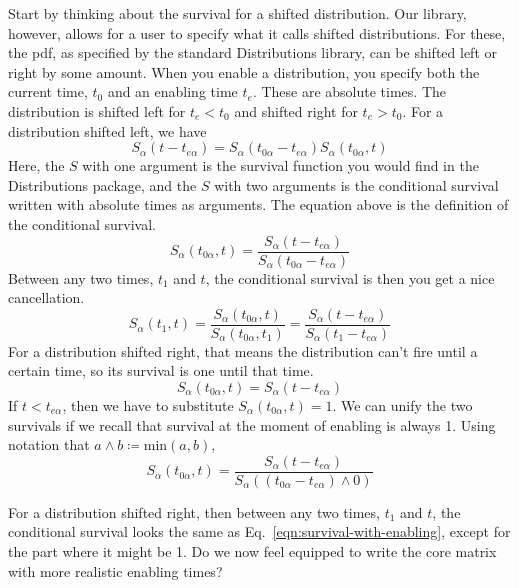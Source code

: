 \documentclass{article}
\begin{document}
Start by thinking about the survival for a shifted distribution. Our library, however, allows for a user to specify what it calls shifted distributions. For these, the pdf, as specified by the standard Distributions library, can be shifted left or right by some amount. When you enable a distribution, you specify both the current time, $t_0$ and an enabling time $t_e$. These are absolute times. The distribution is shifted left for $t_e<t_0$ and shifted right for $t_e>t_0$. For a distribution shifted left, we have
\begin{equation}
	S_{\alpha}(t-t_{e\alpha}) = S_{\alpha}(t_{0\alpha} - t_{e\alpha})S_{\alpha}(t_{0\alpha}, t)
\end{equation}
Here, the $S$ with one argument is the survival function you would find in the Distributions package, and the $S$ with two arguments is the conditional survival written with absolute times as arguments. The equation above is the definition of the conditional survival.
\begin{equation}
	S_{\alpha}(t_{0\alpha}, t) =  \frac{S_{\alpha}(t-t_{e\alpha})}{S_{\alpha}(t_{0\alpha} - t_{e\alpha})}
\end{equation}
Between any two times, $t_1$ and $t$, the conditional survival is then you get a nice cancellation.
\begin{equation}
	S_{\alpha}(t_{1}, t) = \frac{S_{\alpha}(t_{0\alpha}, t)}{S_{\alpha}(t_{0\alpha}, t_1)}
	= \frac{S_{\alpha}(t-t_{e\alpha})}{S_{\alpha}(t_1-t_{e\alpha})}\label{eqn:survival-with-enabling}
\end{equation}
For a distribution shifted right, that means the distribution can't fire until a certain time, so its survival is one until that time.
\begin{equation}
	S_{\alpha}(t_{0\alpha}, t) =  S_{\alpha}(t - t_{e\alpha})
\end{equation}
If $t<t_{e\alpha}$, then we have to substitute $S_{\alpha}(t_{0\alpha}, t)=1$. We can unify the two survivals if we recall that survival at the moment of enabling is always 1. Using notation that $a\wedge b\coloneqq\mbox{min}(a,b)$,
\begin{equation}
	S_{\alpha}(t_{0\alpha}, t) =  \frac{S_{\alpha}(t-t_{e\alpha})}{S_{\alpha}((t_{0\alpha} - t_{e\alpha})\wedge 0)}
\end{equation}

For a distribution shifted right, then between any two times, $t_1$ and $t$, the conditional survival looks the same as Eq.~\ref{eqn:survival-with-enabling}, except for the part where it might be 1. Do we now feel equipped to write the core matrix with more realistic enabling times?
\end{document}
